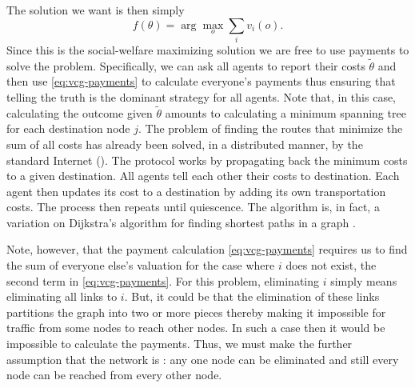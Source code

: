 The solution we want is then simply
\begin{equation}
  \label{eq:network-scf}
  f(\theta) = \arg \max_{o} \sum_{i} v_i(o).
\end{equation}
Since this is the social-welfare maximizing solution we are free to
use  payments to solve the problem. Specifically, we can ask
all agents to report their costs $\tilde{\theta}$ and then use
\eqref{eq:vcg-payments} to calculate everyone's payments thus ensuring
that telling the truth is the dominant strategy for all agents. Note
that, in this case, calculating the outcome given $\tilde{\theta}$
amounts to calculating a minimum spanning tree for each destination
node $j$. The problem of finding the routes that minimize the sum of
all costs has already been solved, in a distributed manner, by the
standard Internet  (). The
protocol works by propagating back the minimum costs to a given
destination.  All agents tell each other their costs to destination.
Each agent then updates its cost to a destination by adding its own
transportation costs. The process then repeats until quiescence. The
algorithm is, in fact, a variation on Dijkstra's algorithm for finding
shortest paths in a graph \cite{dijkstra59a}.

Note, however, that the payment calculation \eqref{eq:vcg-payments}
requires us to find the sum of everyone else's valuation for the case
where $i$ does not exist, the second term in \eqref{eq:vcg-payments}.
For this problem, eliminating $i$ simply means eliminating all links
to $i$. But, it could be that the elimination of these links
partitions the graph into two or more pieces thereby making it
impossible for traffic from some nodes to reach other nodes. In such a
case then it would be impossible to calculate the  payments.
Thus, we must make the further assumption that the network is
: any one node can be eliminated and still every node
can be reached from every other node.

